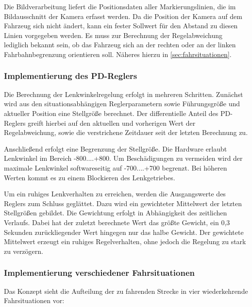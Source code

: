Die Bildverarbeitung liefert die Positionsdaten aller Markierungslinien, die im Bildausschnitt der Kamera erfasst werden. Da die Position der Kamera auf dem Fahrzeug sich nicht ändert, kann ein fester Sollwert für den Abstand zu diesen Linien vorgegeben werden. Es muss zur Berechnung der Regelabweichung lediglich bekannt sein, ob das Fahrzeug sich an der rechten oder an der linken Fahrbahnbegrenzung orientieren soll. Näheres hierzu in \autoref{sec:fahrsituationen}.


\subsubsection{Implementierung des PD-Reglers}
\label{sec:pdregler}
Die Berechnung der Lenkwinkelregelung erfolgt in mehreren Schritten. Zunächst wird aus den situationsabhängigen Reglerparametern sowie Führungsgröße und aktueller Position eine Stellgröße berechnet. Der differentielle Anteil des PD-Reglers greift hierbei auf den aktuellen und vorherigen Wert der Regelabweichung, sowie die verstrichene Zeitdauer seit der letzten Berechnung zu.



Anschließend erfolgt eine Begrenzung der Stellgröße. Die Hardware erlaubt Lenkwinkel im Bereich -800....+800. Um Beschädigungen zu vermeiden wird der maximale Lenkwinkel softwareseitig auf -700....+700 begrenzt. Bei höheren Werten kommt es zu einem Blockieren des Lenkgetriebes.

Um ein ruhiges Lenkverhalten zu erreichen, werden die Ausgangswerte des Reglers zum Schluss geglättet. Dazu wird ein gewichteter Mittelwert der letzten Stellgrößen gebildet. Die Gewichtung erfolgt in Abhängigkeit des zeitlichen Verlaufs. Dabei hat der zuletzt berechnete Wert das größte Gewicht, ein 0,3 Sekunden zurückliegender Wert hingegen nur das halbe Gewicht. Der gewichtete Mittelwert erzeugt ein ruhiges Regelverhalten, ohne jedoch die Regelung zu stark zu verzögern.



\subsubsection{Implementierung verschiedener Fahrsituationen}
\label{sec:fahrsituationen}
Das Konzept sieht die Aufteilung der zu fahrenden Strecke in vier wiederkehrende Fahrsituationen vor:


